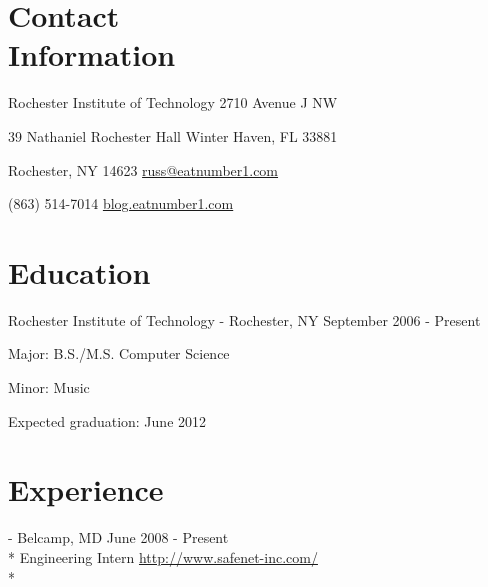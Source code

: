 \documentclass[a4paper,margin,line]{resume}
\newcommand{\rurl}[1]{\hfill {\footnotesize \url{#1}}}
\newcommand{\rdate}[1]{\hfill {\small #1}}
\renewcommand{\employer}[5]{\item[#1] - #2 \rdate{#3} \\* #4 \rurl{#5} \\*}
\begin{document}
\begin{resume}
\section{\mysidestyle Contact \\ Information} \vspace{2mm}
	\begin{asparablank}
		\item Rochester Institute of Technology \hfill 2710 Avenue J NW
		\item 39 Nathaniel Rochester Hall \hfill Winter Haven, FL 33881
		\item Rochester, NY 14623 \hfill \href{mailto:russ@eatnumber1.com}{russ@eatnumber1.com}
		\item (863) 514-7014 \hfill
		\href{http://blog.eatnumber1.com/}{blog.eatnumber1.com}
	\end{asparablank}

\section{\mysidestyle Education}
	\begin{compactdesc}
		\item[Rochester Institute of Technology] - Rochester, NY \rdate{September 2006 - Present}
		\begin{compactitem} { \small
			\item Major: B.S./M.S. Computer Science
			\item Minor: Music
			\item Expected graduation: June 2012
		} \end{compactitem}
	\end{compactdesc}

\section{\mysidestyle Experience}
	\begin{asparadesc}
		\employer{SafeNet Inc}{Belcamp, MD}{June 2008 - Present}{Engineering
		Intern}{http://www.safenet-inc.com/}


\end{asparadesc}
\end{resume}
\end{document}
